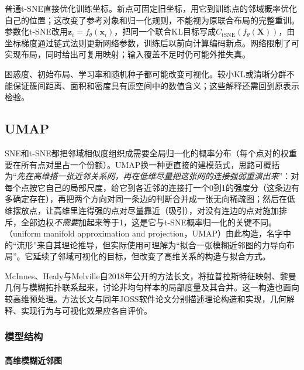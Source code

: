 普通t-SNE直接优化训练坐标。新点可固定旧坐标，用它到训练点的邻域概率优化自己的位置；这改变了参考对象和归一化规则，不能视为原联合布局的完整重训。参数化t-SNE改用$\bm z_i=f_\theta(\bm x_i)$，把同一个联合KL目标写成$C_{\mathrm{tSNE}}(f_\theta(\bm X))$，由坐标梯度通过链式法则更新网络参数，训练后以前向计算编码新点。网络限制了可实现布局，同时给出可复用映射；输入覆盖不足时仍可能外推失真。

困惑度、初始布局、学习率和随机种子都可能改变可视化。较小KL或清晰分群不能保证簇间距离、面积和密度具有原空间中的数值含义；这些解释还需回到原表示检验。

\subsection{UMAP}
\label{sec:dim-umap}

SNE和t-SNE都把邻域相似度组织成需要全局归一化的概率分布（每个点对的权重要在所有点对里占一个份额）。UMAP换一种更直接的建模范式，思路可概括为“\emph{先在高维搭一张近邻关系网，再在低维尽量把这张网的连接强弱重演出来}”：对每个点按它自己的局部尺度，给它到各近邻的连接打一个0到1的强度分（这条边有多确定存在），再把两个方向对同一条边的判断合并成一张无向稀疏图；然后在低维摆放点，让高维里连得强的点对尽量靠近（吸引），对没有连边的点对施加排斥，全部边权\emph{不需要}加起来等于1，这是它与t-SNE概率归一化的关键不同。（uniform manifold approximation and projection，UMAP）由此构造，名字中的“流形”来自其理论推导，但实际使用可理解为“拟合一张模糊近邻图的力导向布局”。它延续了邻域可视化的目标，但改变了高维关系的构造与拟合方式。

McInnes、Healy与Melville自2018年公开的方法长文，将拉普拉斯特征映射、黎曼几何与模糊拓扑联系起来，讨论非均匀样本的局部度量及其合并。这一构造也面向较高维预处理。方法长文与同年JOSS软件论文分别描述理论构造和实现，几何解释、实现行为与可视化效果应各自评价。

\subsubsection{模型结构}

\paragraph{高维模糊近邻图}

